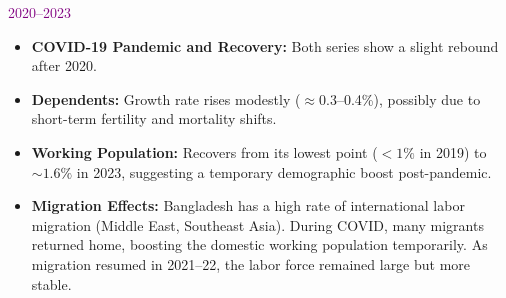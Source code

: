 \textcolor{purple}{2020--2023}
\begin{itemize}[leftmargin=*]
    \item \textbf{COVID-19 Pandemic and Recovery:} Both series show a slight rebound after 2020.
    \item \textbf{Dependents:} Growth rate rises modestly ($\approx 0.3$--0.4\%), possibly due to short-term fertility and mortality shifts.
    \item \textbf{Working Population:} Recovers from its lowest point ($<1\%$ in 2019) to $\sim 1.6\%$ in 2023, suggesting a temporary demographic boost post-pandemic.
    \item \textbf{Migration Effects:} Bangladesh has a high rate of international labor migration (Middle East, Southeast Asia). During COVID, many migrants returned home, boosting the domestic working population temporarily. As migration resumed in 2021--22, the labor force remained large but more stable.
\end{itemize}
